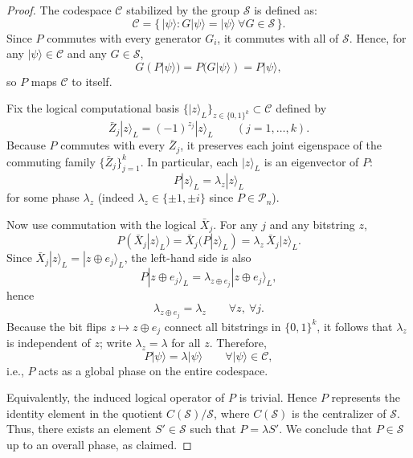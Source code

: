 \documentclass[acmsmallw,review]{acmart}
\begin{document}
\begin{proof}
The codespace $\mathcal{C}$ stabilized by the group $\mathcal{S}$ is defined as:
\[
\mathcal{C} = \{\,|\psi\rangle : G|\psi\rangle = |\psi\rangle \ \forall G \in \mathcal{S}\,\}.
\]
Since $P$ commutes with every generator $G_i$, it commutes with all of $\mathcal{S}$. Hence, for any
$|\psi\rangle \in \mathcal{C}$ and any $G \in \mathcal{S}$,
\[
G(P|\psi\rangle) = P(G|\psi\rangle) = P|\psi\rangle,
\]
so $P$ maps $\mathcal{C}$ to itself.

Fix the logical computational basis $\{|z\rangle_L\}_{z\in\{0,1\}^k} \subset \mathcal{C}$
defined by
\[
\bar{Z}_j |z\rangle_L = (-1)^{z_j}|z\rangle_L \qquad (j=1,\dots,k).
\]
Because $P$ commutes with every $\bar{Z}_j$, it preserves each joint eigenspace of the
commuting family $\{\bar{Z}_j\}_{j=1}^k$. In particular, each $|z\rangle_L$ is an eigenvector of
$P$:
\[
P|z\rangle_L = \lambda_z |z\rangle_L
\]
for some phase $\lambda_z$ (indeed $\lambda_z \in \{\pm 1, \pm i\}$ since $P \in \mathcal{P}_n$).

Now use commutation with the logical $\bar{X}_j$. For any $j$ and any bitstring $z$,
\[
P(\bar{X}_j|z\rangle_L) = \bar{X}_j(P|z\rangle_L) = \lambda_z\,\bar{X}_j|z\rangle_L.
\]
Since $\bar{X}_j|z\rangle_L = |z\oplus e_j\rangle_L$, the left-hand side is also
\[
P|z\oplus e_j\rangle_L = \lambda_{z\oplus e_j}|z\oplus e_j\rangle_L,
\]
hence
\[
\lambda_{z\oplus e_j} = \lambda_z \qquad \forall z,\ \forall j.
\]
Because the bit flips $z \mapsto z\oplus e_j$ connect all bitstrings in $\{0,1\}^k$, it follows that
$\lambda_z$ is independent of $z$; write $\lambda_z=\lambda$ for all $z$. Therefore,
\[
P|\psi\rangle = \lambda |\psi\rangle \qquad \forall |\psi\rangle \in \mathcal{C},
\]
i.e., $P$ acts as a global phase on the entire codespace.

Equivalently, the induced logical operator of $P$ is trivial. Hence $P$ represents the
identity element in the quotient $C(\mathcal{S})/\mathcal{S}$, where $C(\mathcal{S})$ is the centralizer of $\mathcal{S}$. Thus, there exists an element $S' \in \mathcal{S}$ such that
$P = \lambda S'$. We conclude that $P \in \mathcal{S}$ up to an overall phase, as claimed.
\end{proof}
\end{document}

